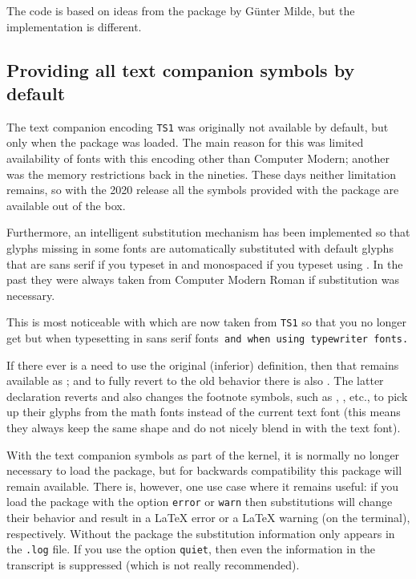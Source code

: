 \documentclass{ltnews}
\begin{document}
The code is based on ideas from the 
package by Günter Milde, but the implementation is different.


\subsection{Providing all text companion symbols by default}

The text companion encoding \texttt{TS1} was originally not available
by default, but only when the  package was loaded. The
main reason for this was limited availability of fonts with this encoding other than
Computer Modern; another was the memory restrictions back in the nineties.
These days neither limitation remains, so with the 2020 release all
the symbols provided with the  package are available out
of the box.

Furthermore, an intelligent substitution mechanism has been
implemented so that glyphs missing in some fonts are automatically
substituted with default glyphs that are sans serif if you typeset in
 and monospaced if you typeset using . In the
past they were always taken from Computer Modern Roman if substitution
was necessary.



\textsf{This is most noticeable with  which are now
  taken from \texttt{TS1} so that you no longer get
  \textrm{} but  when typesetting
  in sans serif fonts}\texttt{ and  when using
  typewriter fonts.}

If there ever is a need to use the original (inferior) definition,
then that remains available as ; and to fully
revert to the old behavior there is also
. The latter declaration reverts 
and also changes the footnote symbols, such as ,
, etc., to pick up their glyphs from the math
fonts instead of the current text font (this means they always keep
the same shape and do not nicely blend in with the text font).

With the text companion symbols as part of the kernel, it is normally
no longer necessary to load the  package, but for
backwards compatibility this package will remain available.  There is,
however, one use case where it remains useful: if you load the package
with the option \texttt{error} or \texttt{warn} then substitutions
will change their behavior and result in a \LaTeX{} error or a
\LaTeX{} warning (on the terminal), respectively. Without the package
the substitution information only appears in the \texttt{.log}
file. If you use the option \texttt{quiet}, then even the information in
the transcript is suppressed (which is not really recommended).
\end{document}
